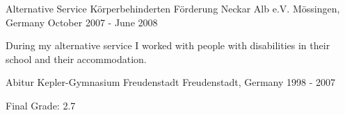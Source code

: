\begin{cventries}
{    }
  \cventry
    {Alternative Service}
    {Körperbehinderten Förderung Neckar Alb e.V.}
    {Mössingen, Germany}
    {October 2007 - June 2008}
    {
      \begin{cvitems}
      \item[] {During my alternative service I worked with people with disabilities in
	their school and their accommodation.}
      \end{cvitems}
    }
  \cventry
    {Abitur}
    {Kepler-Gymnasium Freudenstadt}
    {Freudenstadt, Germany}
    {1998 - 2007}
    {
      \begin{cvitems}
      \item[] {Final Grade: 2.7}
      \end{cvitems}
    }
\end{cventries}
